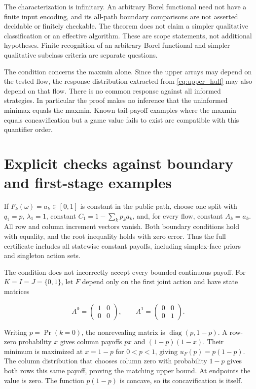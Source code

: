 \documentclass[11pt,a4paper]{article}
\begin{document}
The characterization is infinitary. An arbitrary Borel functional need not have a finite input encoding, and its all-path boundary comparisons are not asserted decidable or finitely checkable. The theorem does not claim a simpler qualitative classification or an effective algorithm. These are scope statements, not additional hypotheses. Finite recognition of an arbitrary Borel functional and simpler qualitative subclass criteria are separate questions.

The condition concerns the maxmin alone. Since the upper arrays may depend on the tested flow, the response distribution extracted from \eqref{eq:upper_hull} may also depend on that flow. There is no common response against all informed strategies. In particular the proof makes no inference that the uninformed minimax equals the maxmin. Known tail-payoff examples where the maxmin equals concavification but a game value fails to exist are compatible with this quantifier order.

\section{Explicit checks against boundary and first-stage examples}

If \(F_k(\omega)=a_k\in[0,1]\) is constant in the public path, choose one split with \(q_1=p\), \(\lambda_1=1\), constant \(C_1=1-\sum_kp_ka_k\), and, for every flow, constant \(A_k=a_k\). All row and column increment vectors vanish. Both boundary conditions hold with equality, and the root inequality holds with zero error. Thus the full certificate includes all statewise constant payoffs, including simplex-face priors and singleton action sets.

The condition does not incorrectly accept every bounded continuous payoff. For \(K=I=J=\{0,1\}\), let \(F\) depend only on the first joint action and have state matrices

\[
A^0=\begin{pmatrix}1&0\\0&0\end{pmatrix},
\qquad A^1=\begin{pmatrix}0&0\\0&1\end{pmatrix}.
\]

Writing \(p=\Pr(k=0)\), the nonrevealing matrix is \(\operatorname{diag}(p,1-p)\). A row-zero probability \(x\) gives column payoffs \(px\) and \((1-p)(1-x)\). Their minimum is maximized at \(x=1-p\) for \(0<p<1\), giving \(u_F(p)=p(1-p)\). The column distribution that chooses column zero with probability \(1-p\) gives both rows this same payoff, proving the matching upper bound. At endpoints the value is zero. The function \(p(1-p)\) is concave, so its concavification is itself.
\end{document}
